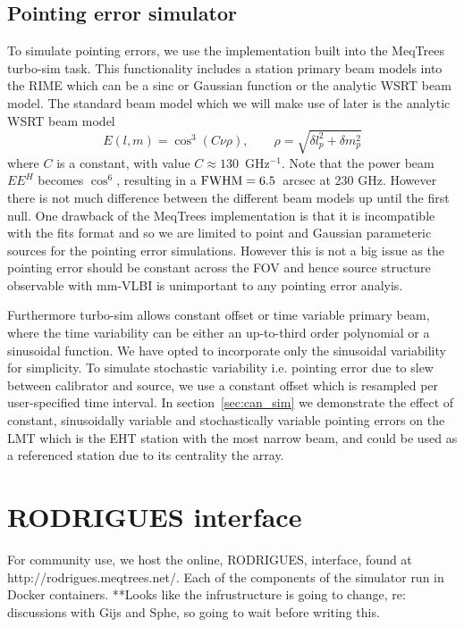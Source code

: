 \subsection{Pointing error simulator}\label{sec:point_imp}

To simulate pointing errors, we use the implementation built into the {\sc MeqTrees} turbo-sim task. This functionality includes a station primary beam models into the RIME which can be a sinc or Gaussian function or the analytic WSRT beam model. The standard beam model which we will make use of later is the analytic WSRT beam model \citep{Popping_2008} 
\begin{equation}
E(l, m) = \cos^3(C\nu \rho),\qquad   \rho = \sqrt{\delta l_p^2 + \delta m_p^2}
\end{equation}
where $C$ is a constant, with value $C \approx 130$~GHz$^{-1}$. Note that the power beam $EE^H$ becomes $\cos^6$, resulting in a $\rm{FWHM} = 6.5 $~arcsec at 230 GHz. However there is not much difference between the different beam models up until the first null. One drawback of the {\sc MeqTrees} implementation is that it is incompatible with the {\sc fits} format and so we are limited to point and Gaussian parameteric sources for the pointing error simulations. However this is not a big issue as the pointing error should be constant across the FOV and hence source structure observable with mm-VLBI is unimportant to any pointing error analyis.

Furthermore turbo-sim allows constant offset or time variable primary beam, where the time variability can be either an up-to-third order polynomial or a sinusoidal function. We have opted to incorporate only the sinusoidal variability for simplicity. To simulate stochastic variability i.e. pointing error due to slew between calibrator and source, we use a constant offset which is resampled per user-specified time interval. In section~\ref{sec:can_sim} we demonstrate the effect of constant, sinusoidally variable and stochastically variable pointing errors on the LMT which is the EHT station with the most narrow beam, and could be used as a referenced station due to its centrality the array.


\section{RODRIGUES interface}
For community use, we host the online, RODRIGUES, interface, found at http://rodrigues.meqtrees.net/. Each of the components of the simulator run in Docker containers. **Looks like the infrustructure is going to change, re: discussions with Gijs and Sphe, so going to wait before writing this.
